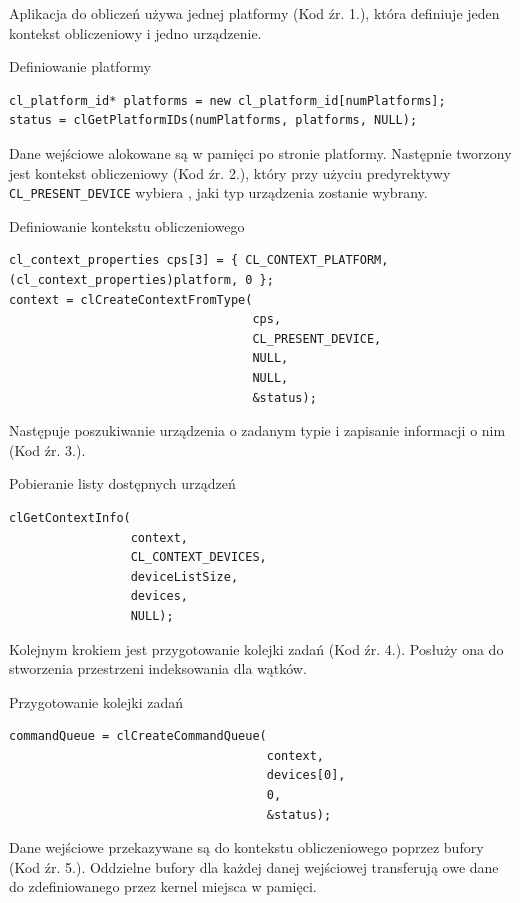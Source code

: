 Aplikacja do obliczeń używa jednej platformy (Kod źr. 1.), która definiuje jeden kontekst obliczeniowy i jedno urządzenie.
\begin{program}
\caption{Definiowanie platformy}
\begin{lstlisting}
cl_platform_id* platforms = new cl_platform_id[numPlatforms];
status = clGetPlatformIDs(numPlatforms, platforms, NULL);
\end{lstlisting}
\end{program}
Dane wejściowe alokowane są w pamięci po stronie platformy. Następnie tworzony jest kontekst obliczeniowy (Kod źr. 2.), który przy użyciu predyrektywy \verb|CL_PRESENT_DEVICE| wybiera , jaki typ urządzenia zostanie wybrany.
\begin{program}
\caption{Definiowanie kontekstu obliczeniowego}
\begin{lstlisting}
cl_context_properties cps[3] = { CL_CONTEXT_PLATFORM, (cl_context_properties)platform, 0 };
context = clCreateContextFromType(
                                  cps, 
                                  CL_PRESENT_DEVICE, 
                                  NULL, 
                                  NULL, 
                                  &status);
\end{lstlisting}
\end{program}
Następuje poszukiwanie urządzenia o zadanym typie i zapisanie informacji o nim (Kod źr. 3.).
\begin{program}
\caption{Pobieranie listy dostępnych urządzeń}
\begin{lstlisting}
clGetContextInfo(
                 context, 
                 CL_CONTEXT_DEVICES, 
                 deviceListSize, 
                 devices, 
                 NULL);

\end{lstlisting}
\end{program}
Kolejnym krokiem jest przygotowanie kolejki zadań (Kod źr. 4.). Posłuży ona do stworzenia przestrzeni indeksowania dla wątków.
\begin{program}
\caption{Przygotowanie kolejki zadań}
\begin{lstlisting}
commandQueue = clCreateCommandQueue(
                                    context, 
                                    devices[0], 
                                    0, 
                                    &status);
\end{lstlisting}
\end{program}
Dane wejściowe przekazywane są do kontekstu obliczeniowego poprzez bufory (Kod źr. 5.). Oddzielne bufory dla każdej danej wejściowej transferują owe  dane do zdefiniowanego przez kernel miejsca w pamięci. 
